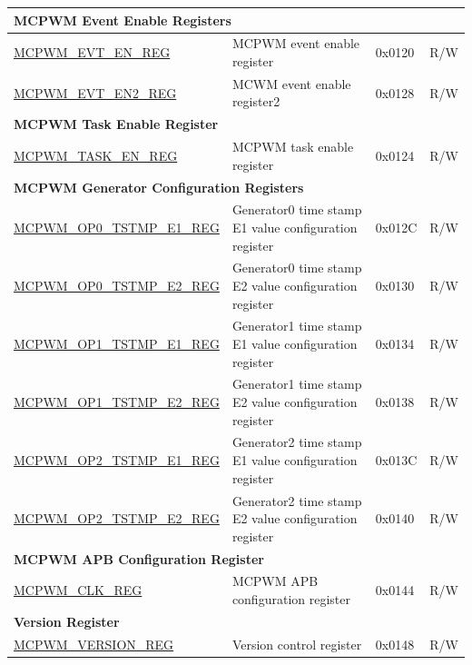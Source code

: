\begin{longtable}{ | p{6cm} | p{7.2cm} | p{1.3cm} | p{1cm} | }
\multicolumn{4}{|l|}{\textbf{MCPWM Event Enable Registers}} \\ \hline
\hyperref[regdesc:MCPWMEVTENREG]{MCPWM\_EVT\_EN\_REG} & MCPWM event enable register & 0x0120 & R/W \\ \hline
\hyperref[regdesc:MCPWMEVTEN2REG]{MCPWM\_EVT\_EN2\_REG} & MCWM event enable register2 & 0x0128 & R/W \\ \hline

\multicolumn{4}{|l|}{\textbf{MCPWM Task Enable Register}} \\ \hline
\hyperref[regdesc:MCPWMTASKENREG]{MCPWM\_TASK\_EN\_REG} & MCPWM task enable register & 0x0124 & R/W \\ \hline

\multicolumn{4}{|l|}{\textbf{MCPWM Generator Configuration Registers}} \\ \hline
\hyperref[regdesc:MCPWMOPNTSTMPE1REG]{MCPWM\_OP0\_TSTMP\_E1\_REG} & Generator0 time stamp E1 value configuration register & 0x012C & R/W \\ \hline
\hyperref[regdesc:MCPWMOPNTSTMPE2REG]{MCPWM\_OP0\_TSTMP\_E2\_REG} & Generator0 time stamp E2 value configuration register & 0x0130 & R/W \\ \hline
\hyperref[regdesc:MCPWMOPNTSTMPE1REG]{MCPWM\_OP1\_TSTMP\_E1\_REG} & Generator1 time stamp E1 value configuration register & 0x0134 & R/W \\ \hline
\hyperref[regdesc:MCPWMOPNTSTMPE2REG]{MCPWM\_OP1\_TSTMP\_E2\_REG} & Generator1 time stamp E2 value configuration register & 0x0138 & R/W \\ \hline
\hyperref[regdesc:MCPWMOPNTSTMPE1REG]{MCPWM\_OP2\_TSTMP\_E1\_REG} & Generator2 time stamp E1 value configuration register & 0x013C & R/W \\ \hline
\hyperref[regdesc:MCPWMOPNTSTMPE2REG]{MCPWM\_OP2\_TSTMP\_E2\_REG} & Generator2 time stamp E2 value configuration register & 0x0140 & R/W \\ \hline

\multicolumn{4}{|l|}{\textbf{MCPWM APB Configuration Register}} \\ \hline
\hyperref[regdesc:MCPWMCLKREG]{MCPWM\_CLK\_REG} & MCPWM APB configuration register & 0x0144 & R/W \\ \hline

\multicolumn{4}{|l|}{\textbf{Version Register}} \\ \hline
\hyperref[regdesc:MCPWMVERSIONREG]{MCPWM\_VERSION\_REG} & Version control register & 0x0148 &  R/W \\ \hline
\end{longtable}

